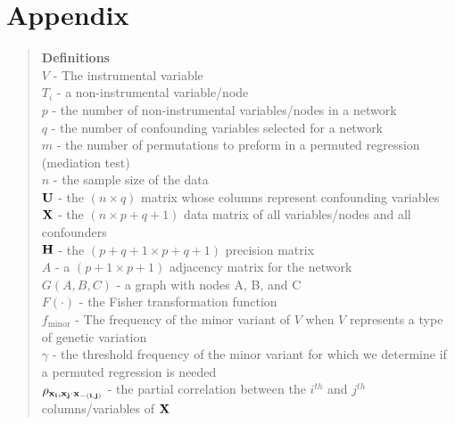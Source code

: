 \documentclass[12pt]{report}
\begin{document}
\section*{Appendix}
\begin{quote}
\textbf{Definitions}\\
$V$ - The instrumental variable\\
$T_i$ - a non-instrumental variable/node\\
$p$ - the number of non-instrumental variables/nodes in a network\\
$q$ - the number of confounding variables selected for a network\\
$m$ - the number of permutations to preform in a permuted regression (mediation test)\\
$n$ - the sample size of the data\\
$\bf U$ - the $(n \times q)$ matrix whose columns represent confounding variables\\
$\bf X$ - the $(n \times p+q+1)$ data matrix of all variables/nodes and all confounders\\
$\bf H$ - the $(p+q+1 \times p+q+1)$ precision matrix \\
$A$ - a $(p+1 \times p+1)$ adjacency matrix for the network  \\
$G(A,B,C)$ - a graph with nodes A, B, and C\\
$F(\cdot)$ - the Fisher transformation function\\
$f_{\text{minor}}$ - The frequency of the minor variant of $V$ when $V$ represents a type of genetic variation\\
$\gamma$ - the threshold frequency of the minor variant for which we determine if a permuted regression is needed\\
$\rho_{\bf x_i,x_j\cdot x_{ -(i,j)}  }$ - the partial correlation between the $i^{th}$ and $j^{th}$ columns/variables of ${\bf X}$
\end{quote}
\end{document}
